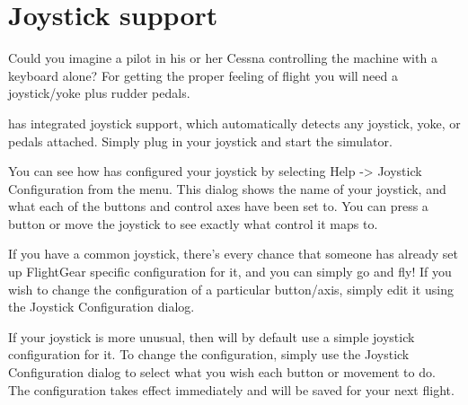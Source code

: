 \section{Joystick support\label{joysticksupp}}
Could you imagine a pilot in his or her Cessna controlling the machine with
a keyboard alone? For getting the proper feeling of flight you will need a
joystick/yoke plus rudder pedals.

\FlightGear{} has integrated joystick support, which automatically detects
any joystick, yoke, or pedals attached. Simply plug in your joystick and start
the simulator.

You can see how \FlightGear{} has configured your joystick by selecting 
Help -> Joystick Configuration from the menu.  This dialog shows the name
of your joystick, and what each of the buttons and control axes have been set to.  
You can press a button or move the joystick to see exactly what control it maps to.

If you have a common joystick, there's every chance that someone has already 
set up FlightGear specific configuration for it, and you can simply go and fly!
If you wish to change the configuration of a particular button/axis, simply edit
it using the Joystick Configuration dialog.

If your joystick is more unusual, then \FlightGear{} will by default use a simple
joystick configuration for it.  To change the configuration, simply use the Joystick
Configuration dialog to select what you wish each button or movement to do.  The
configuration takes effect immediately and will be saved for your next flight.

